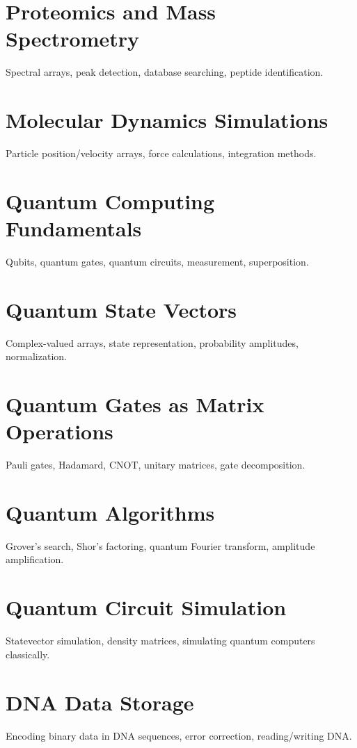 \chapter{Proteomics and Mass Spectrometry}
Spectral arrays, peak detection, database searching, peptide identification.

\chapter{Molecular Dynamics Simulations}
Particle position/velocity arrays, force calculations, integration methods.


\chapter{Quantum Computing Fundamentals}
Qubits, quantum gates, quantum circuits, measurement, superposition.

\chapter{Quantum State Vectors}
Complex-valued arrays, state representation, probability amplitudes, normalization.

\chapter{Quantum Gates as Matrix Operations}
Pauli gates, Hadamard, CNOT, unitary matrices, gate decomposition.

\chapter{Quantum Algorithms}
Grover's search, Shor's factoring, quantum Fourier transform, amplitude amplification.

\chapter{Quantum Circuit Simulation}
Statevector simulation, density matrices, simulating quantum computers classically.


\chapter{DNA Data Storage}
Encoding binary data in DNA sequences, error correction, reading/writing DNA.

